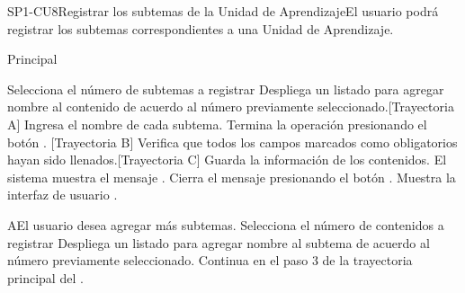 \begin{UseCase}{SP1-CU8}{Registrar los subtemas de la Unidad de Aprendizaje}{El usuario podrá registrar los subtemas correspondientes a una Unidad de Aprendizaje.}
\end{UseCase}

\begin{UCtrayectoria}{Principal}

    \UCpaso[\UCactor] Selecciona el número de subtemas a registrar
    \UCpaso Despliega un listado para agregar nombre al contenido de acuerdo al número previamente seleccionado.[Trayectoria A]
    \UCpaso[\UCactor] Ingresa el nombre de cada subtema.
    \UCpaso[\UCactor] Termina la operación presionando el botón . [Trayectoria B]
    \UCpaso Verifica que todos los campos marcados como obligatorios hayan sido llenados.[Trayectoria C]
    \UCpaso Guarda la información de los contenidos.
    \UCpaso El sistema muestra el mensaje .
    \UCpaso[\UCactor] Cierra el mensaje presionando el botón .
    \UCpaso Muestra la interfaz de usuario .
\end{UCtrayectoria}


\begin{UCtrayectoriaA}{A}{El usuario desea agregar más subtemas.}
    \UCpaso[\UCactor] Selecciona el número de contenidos a registrar
    \UCpaso Despliega un listado para agregar nombre al subtema de acuerdo al número previamente seleccionado.
    \UCpaso Continua en el paso 3 de la trayectoria principal del .

\end{UCtrayectoriaA}

